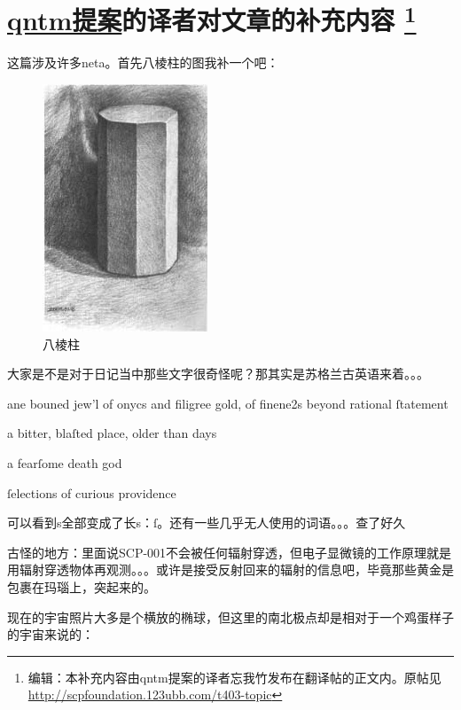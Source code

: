 \chapter[qntm提案的译者对文章的补充内容]{
	\hyperref[chap:SCP.001.the.lock]{qntm提案}的译者对文章的补充内容
	\protect\footnote{
		编辑\QIS ：本补充内容由qntm提案的译者忘我竹发布在翻译帖的正文内。原帖见 \url{http://scpfoundation.123ubb.com/t403-topic}
	}
}

\label{chap:qntm.translator.append}

这篇涉及许多neta。首先八棱柱的图我补一个吧：

\begin{figure}[H]
	\centering
	\includegraphics{images/appendix-2-1.jpg}
	\caption*{八棱柱}
\end{figure}

大家是不是对于日记当中那些文字很奇怪呢？那其实是苏格兰古英语来着。。。

ane bouned jew'l of onycs and filigree gold, of finene2s beyond rational ſtatement

a bitter, blaſted place, older than days

a fearſome death god

ſelections of curious providence

可以看到s全部变成了长s：ſ。还有一些几乎无人使用的词语。。。查了好久

古怪的地方：里面说SCP-001不会被任何辐射穿透，但电子显微镜的工作原理就是用辐射穿透物体再观测。。。或许是接受反射回来的辐射的信息吧，毕竟那些黄金是包裹在玛瑙上，突起来的。

现在的宇宙照片大多是个横放的椭球，但这里的南北极点却是相对于一个鸡蛋样子的宇宙来说的：

